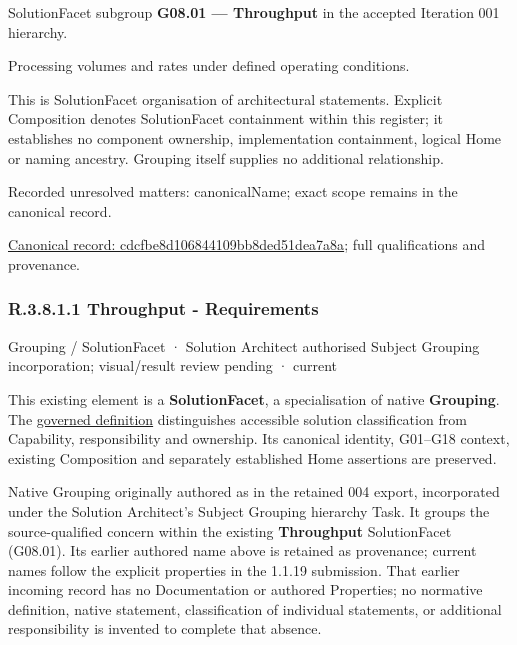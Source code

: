 SolutionFacet subgroup \textbf{G08.01 — Throughput} in the accepted Iteration 001 hierarchy.



Processing volumes and rates under defined operating conditions.



This is SolutionFacet organisation of architectural statements. Explicit Composition denotes SolutionFacet containment within this register; it establishes no component ownership, implementation containment, logical Home or naming ancestry. Grouping itself supplies no additional relationship.


{\small Recorded unresolved matters: canonicalName; exact scope remains in the canonical record.}\par
{\footnotesize \href{../../../../../../../continuum/grouping/cdcfbe8d106844109bb8ded51dea7a8a.md}{Canonical record: cdcfbe8d106844109bb8ded51dea7a8a}; full qualifications and provenance.}\par
\subsubsection*{R.3.8.1.1 Throughput - Requirements}
\label{navigation:R.3.8.1.1}

\label{element:20326d2f4f2e44dcbe12db38deea02d0}
{\small Grouping / SolutionFacet · Solution Architect authorised Subject Grouping incorporation; visual/result review pending · current}\par

This existing element is a \textbf{SolutionFacet}, a specialisation of native
\textbf{Grouping}. The \href{\detokenize{../../../../../../../governance/continuum-representation.md#solutionfacet-classification--1119-candidate}}{governed definition}
distinguishes accessible solution classification from Capability, responsibility
and ownership. Its canonical identity, G01–G18 context, existing Composition
and separately established Home assertions are preserved.



Native Grouping originally authored as \texttt{} in the retained 004 export,
incorporated under the Solution Architect's Subject Grouping hierarchy Task.
It groups the source-qualified \texttt{} concern within
the existing \textbf{Throughput} SolutionFacet (G08.01). Its earlier authored name above is retained as provenance; current names
follow the explicit properties in the 1.1.19 submission.
That earlier incoming record has no Documentation or authored Properties; no normative
definition, native statement, classification of individual statements, or
additional responsibility is invented to complete that absence.



